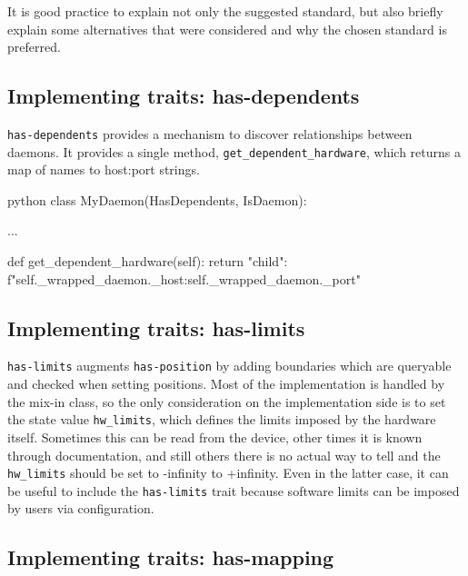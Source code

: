 It is good practice to explain not only the suggested standard, but also briefly explain some alternatives that were considered and why the chosen standard is preferred.

\subsection{Implementing traits: has-dependents}

\texttt{has-dependents} provides a mechanism to discover relationships between daemons.
It provides a single method, \texttt{get\_dependent\_hardware}, which returns a map of names to host:port strings.

\begin{codefragment}{python}
class MyDaemon(HasDependents, IsDaemon):

    ...

    def get_dependent_hardware(self):
        return {"child": f"{self._wrapped_daemon._host}:{self._wrapped_daemon._port}"}
\end{codefragment}

\subsection{Implementing traits: has-limits}

\texttt{has-limits} augments \texttt{has-position} by adding boundaries which are queryable and checked when setting positions.
Most of the implementation is handled by the mix-in class, so the only consideration on the implementation side is to set the state value \texttt{hw\_limits}, which defines the limits imposed by the hardware itself.
Sometimes this can be read from the device, other times it is known through documentation, and still others there is no actual way to tell and the \texttt{hw\_limits} should be set to -infinity to +infinity.
Even in the latter case, it can be useful to include the \texttt{has-limits} trait because software limits can be imposed by users via configuration.

\subsection{Implementing traits: has-mapping}

